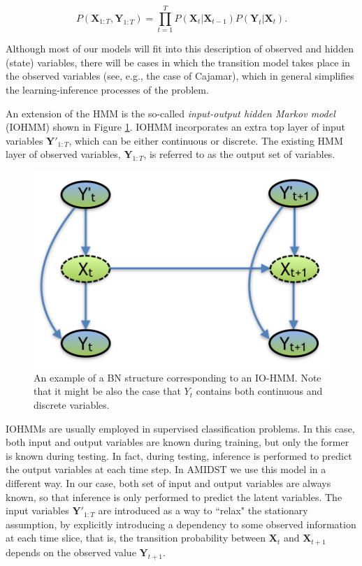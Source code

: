 \begin{equation}
P(\bm X_{1:T},\bm Y_{1:T}) = \prod_{t=1}^T{P(\bm X_t| \bm X_{t-1})P(\bm Y_t|\bm X_t)}.
\end{equation}

Although most of our models will fit into this description of observed and hidden (state) variables, there will be cases in which the transition model takes place in the observed variables (see, e.g., the case of Cajamar), which in general simplifies the learning-inference processes of the problem.

An extension of the HMM is the so-called \textit{input-output hidden Markov model} (IOHMM) shown in Figure \ref{Figure:IO-HMM}. IOHMM incorporates an extra top layer of input variables $\bm Y'_{1:T}$, which can be either continuous or discrete. The existing HMM layer of observed variables, $\bm Y_{1:T}$, is referred to as the output set of variables. 

\begin{figure}[ht!]
\begin{center}
\includegraphics[scale=0.4]{./figures/PreliminariesIO-HMM}
\caption{\label{Figure:IO-HMM}An example of a BN structure corresponding to an IO-HMM. Note that it might be also the case that $Y_t$ contains both continuous and discrete variables.}
\end{center}
\end{figure}

IOHMMs are usually employed in supervised classification problems. In this case, both input and output variables are known during training, but only the former is known during testing. In fact, during testing, inference is performed to predict the output variables at each time step. In AMIDST we use this model in a different way. In our case, both set of input and output variables are always known, so that inference is only performed to predict the latent variables. The input variables $\bm Y'_{1:T}$ are introduced as a way to ``relax" the stationary assumption, by explicitly introducing a dependency to some observed information at each time slice, that is, the transition probability between $\bm X_t$ and $\bm X_{t+1}$ depends on the observed value $\bm Y_{t+1}$. 

